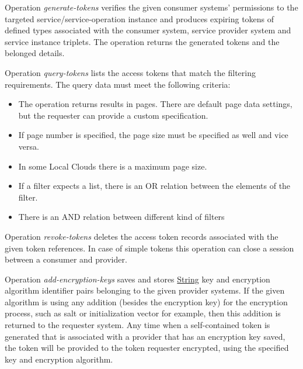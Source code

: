 \documentclass[a4paper]{arrowhead}
\newcommand{\pref}[1]{{\textcolor{ArrowheadGrey}{\hyperref[sec:model:primitives:#1]{#1}}}}
\begin{document}
Operation \textit{generate-tokens} verifies the given consumer systems' permissions to the targeted service/service-operation instance and produces expiring tokens of defined types associated with the consumer system, service provider system and  service instance triplets. The operation returns the generated tokens and the belonged details.


Operation \textit{query-tokens} lists the access tokens that match the filtering requirements. The query data must meet the following criteria:

\begin{itemize}
    \item The operation returns results in pages. There are default page data settings, but the requester can provide a custom specification.
    \item If page number is specified, the page size must be specified as well and vice versa.
    \item In some Local Clouds there is a maximum page size.
    \item If a filter expects a list, there is an OR relation between the elements of the filter.
    \item There is an AND relation between different kind of filters
\end{itemize}


Operation \textit{revoke-tokens} deletes the access token records associated with the given token references. In case of simple tokens this operation can close a session between a consumer and provider.


Operation \textit{add-encryption-keys} saves and stores \pref{String} key and encryption algorithm identifier pairs belonging to the given provider systems. If the given algorithm is using any addition (besides the encryption key) for the encryption process, such as salt or initialization vector for example, then this addition is returned to the requester system. Any time when a self-contained token is generated that is associated with a provider that has an encryption key saved, the token will be provided to the token requester encrypted, using the specified key and encryption algorithm.
\end{document}
